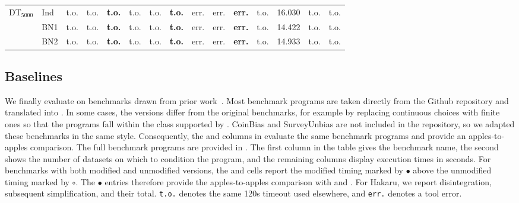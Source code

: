 \begin{table}[!t]
{\begin{tabular}{llccccccccccccc}
  \midrule
  DT$_{5000}$       & Ind  & t.o. & t.o. & \textbf{t.o.} & t.o. & t.o. & \textbf{t.o.} & err. & err. & \textbf{err.} & t.o. & 16.030 & t.o. & t.o. \\
                  & BN1  & t.o. & t.o. & \textbf{t.o.} & t.o. & t.o. & \textbf{t.o.} & err. & err. & \textbf{err.} & t.o. & 14.422 & t.o. & t.o. \\
                  & BN2  & t.o. & t.o. & \textbf{t.o.} & t.o. & t.o. & \textbf{t.o.} & err. & err. & \textbf{err.} & t.o. & 14.933 & t.o. & t.o. \\
  \bottomrule
  \end{tabular}
  }
\end{table}

\FloatBarrier
\subsection{Baselines}
We finally evaluate \Slice{} on benchmarks drawn from prior work~\cite{gehr2016psi,Saad2021SPPL}. Most benchmark programs are taken directly from the \SPPL{} Github repository and translated into \Slice{}. In some cases, the \SPPL{} versions differ from the original \PSI{} benchmarks, for example by replacing continuous choices with finite ones so that the programs fall within the class supported by \SPPL{}. CoinBias and SurveyUnbias are not included in the \SPPL{} repository, so we adapted these benchmarks in the same style. Consequently, the \Slice{} and \SPPL{} columns in  evaluate the same benchmark programs and provide an apples-to-apples comparison. The full benchmark programs are provided in . The first column in the table gives the benchmark name, the second shows the number of datasets on which to condition the program, and the remaining columns display execution times in seconds. For benchmarks with both modified and unmodified versions, the \PSI{} and \Hakaru{} cells report the modified timing marked by $\bullet$ above the unmodified timing marked by $\circ$. The $\bullet$ entries therefore provide the apples-to-apples comparison with \Slice{} and \SPPL{}. For Hakaru, we report disintegration, subsequent simplification, and their total. \texttt{t.o.} denotes the same 120s timeout used elsewhere, and \texttt{err.} denotes a tool error.

